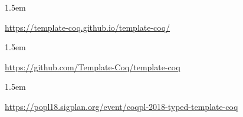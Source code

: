 \documentclass[12pt,twoside]{article}
\begin{document}
\begin{mddefinitions}%


\begin{mdbmarginx}{}{}{}{1.5em}%
\begin{mddefdata}%
\href{https://template-coq.github.io/template-coq/}{{\ttfamily https://\hspace{0pt}template-\hspace{0pt}coq.\hspace{0pt}github.\hspace{0pt}io/\hspace{0pt}template-\hspace{0pt}coq/\hspace{0pt}}}
\end{mddefdata}%
\end{mdbmarginx}%


\begin{mdbmarginx}{}{}{}{1.5em}%
\begin{mddefdata}%
\href{https://github.com/Template-Coq/template-coq}{{\ttfamily https://\hspace{0pt}github.\hspace{0pt}com/\hspace{0pt}Template-\hspace{0pt}Coq/\hspace{0pt}template-\hspace{0pt}coq}}
\end{mddefdata}%
\end{mdbmarginx}%


\begin{mdbmarginx}{}{}{}{1.5em}%
\begin{mddefdata}%
\href{https://popl18.sigplan.org/event/coqpl-2018-typed-template-coq}{{\ttfamily https://\hspace{0pt}popl18.\hspace{0pt}sigplan.\hspace{0pt}org/\hspace{0pt}event/\hspace{0pt}coqpl-\hspace{0pt}2018-\hspace{0pt}typed-\hspace{0pt}template-\hspace{0pt}coq}}%
\end{mddefdata}%
\end{mdbmarginx}%
\end{mddefinitions}%
\end{document}
